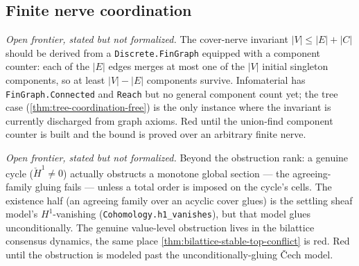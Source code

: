 \subsection{Finite nerve coordination}

\begin{theorem}\label{thm:fingraph-components-count}\notready{}
\emph{Open frontier, stated but not formalized.} The cover-nerve invariant
$|V|\le|E|+|C|$ should be derived from a \texttt{Discrete.FinGraph} equipped
with a component counter: each of the $|E|$ edges merges at most one of the
$|V|$ initial singleton components, so at least $|V|-|E|$ components survive.
Infomaterial has \texttt{FinGraph.Connected} and \texttt{Reach} but no general
component count yet; the tree case (\cref{thm:tree-coordination-free}) is the
only instance where the invariant is currently discharged from graph axioms.
Red until the union-find component counter is built and the bound is proved
over an arbitrary finite nerve.
\end{theorem}

\begin{theorem}\label{thm:coordination-value-converse}\notready{}
\emph{Open frontier, stated but not formalized.} Beyond the obstruction rank:
a genuine cycle ($\check H^1\neq0$) actually obstructs a monotone global
section --- the agreeing-family gluing fails --- unless a total order is
imposed on the cycle's cells. The existence half (an agreeing family over an
acyclic cover glues) is the settling sheaf model's $H^1$-vanishing
(\texttt{Cohomology.h1\_vanishes}), but that model glues unconditionally. The
genuine value-level obstruction lives in the bilattice consensus dynamics, the
same place \cref{thm:bilattice-stable-top-conflict} is red. Red until the
obstruction is modeled past the unconditionally-gluing \v{C}ech model.
\end{theorem}
